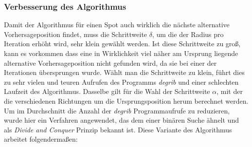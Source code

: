 \subsubsection{Verbesserung des Algorithmus}
Damit der Algorithmus für einen Spot auch wirklich die nächste
alternative Vorhersageposition findet, muss die Schrittweite $\delta$,
um die der Radius pro Iteration erhöht wird, sehr klein gewählt
werden. Ist diese Schrittweite zu groß, kann es vorkommen dass eine in
Wirklichkeit viel näher am Ursprung liegende alternative
Vorhersageposition nicht gefunden wird, da sie bei einer der
Iterationen übersprungen wurde. Wählt man die Schrittweite zu klein,
führt dies zu sehr vielen und teuren Aufrufen des Programms
\textit{degrib} und einer schlechten Laufzeit des
Algorithmus. Dasselbe gilt für die Wahl der Schrittweite $\alpha$, mit
der die verschiedenen Richtungen um die Ursprungsposition herum
berechnet werden. Um im Durchschnitt die Anzahl der \textit{degrib}
Programmaufrufe zu reduzieren, wurde hier ein Verfahren angewendet,
das dem einer binären Suche ähnelt und als \textit{Divide and Conquer}
Prinzip bekannt ist. Diese Variante des Algorithmus arbeitet
folgendermaßen:

